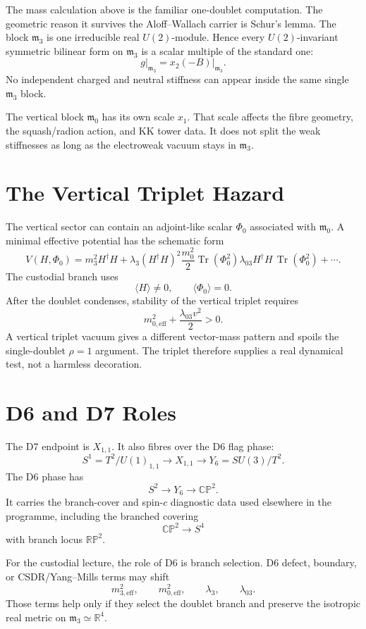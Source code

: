 \documentclass[11pt]{article}
\newcommand{\CP}{\mathbb{CP}}
\newcommand{\RP}{\mathbb{RP}}
\newcommand{\RR}{\mathbb{R}}
\newcommand{\mzero}{\mathfrak m_0}
\newcommand{\mthree}{\mathfrak m_3}
\newcommand{\Tr}{\operatorname{Tr}}
\begin{document}
The mass calculation above is the familiar one-doublet computation.  The
geometric reason it survives the Aloff--Wallach carrier is Schur's lemma.
The block \(\mthree\) is one irreducible real \(U(2)\)-module.  Hence every
\(U(2)\)-invariant symmetric bilinear form on \(\mthree\) is a scalar
multiple of the standard one:
\[
g\big|_{\mthree}=x_2(-B)\big|_{\mthree}.
\]
No independent charged and neutral stiffness can appear inside the same
single \(\mthree\) block.

The vertical block \(\mzero\) has its own scale \(x_1\).  That scale affects
the fibre geometry, the squash/radion action, and KK tower data.  It does
not split the weak stiffnesses as long as the electroweak vacuum stays in
\(\mthree\).

\section{The Vertical Triplet Hazard}

The vertical sector can contain an adjoint-like scalar \(\Phi_0\) associated
with \(\mzero\).  A minimal effective potential has the schematic form
\[
V(H,\Phi_0)=
m_3^2 H^\dagger H+\lambda_3(H^\dagger H)^2
\frac{m_0^2}{2}\Tr(\Phi_0^2)
\lambda_{03}H^\dagger H\,\Tr(\Phi_0^2)+\cdots .
\]
The custodial branch uses
\[
\langle H\rangle\ne0,\qquad \langle\Phi_0\rangle=0 .
\]
After the doublet condenses, stability of the vertical triplet requires
\[
m_{0,\mathrm{eff}}^2+\frac{\lambda_{03}v^2}{2}>0 .
\]
A vertical triplet vacuum gives a different vector-mass pattern and spoils
the single-doublet \(\rho=1\) argument.  The triplet therefore supplies a
real dynamical test, not a harmless decoration.

\section{D6 and D7 Roles}

The D7 endpoint is \(X_{1,1}\).  It also fibres over the D6 flag phase:
\[
S^1=T^2/U(1)_{1,1}\longrightarrow X_{1,1}\longrightarrow
Y_6=SU(3)/T^2 .
\]
The D6 phase has
\[
S^2\longrightarrow Y_6\longrightarrow \CP^2 .
\]
It carries the branch-cover and spin-\(c\) diagnostic data used elsewhere in
the programme, including the branched covering
\[
\CP^2\longrightarrow S^4
\]
with branch locus \(\RP^2\).

For the custodial lecture, the role of D6 is branch selection.  D6 defect,
boundary, or CSDR/Yang--Mills terms may shift
\[
m_{3,\mathrm{eff}}^2,\qquad m_{0,\mathrm{eff}}^2,\qquad \lambda_3,\qquad
\lambda_{03}.
\]
Those terms help only if they select the doublet branch and preserve the
isotropic real metric on \(\mthree\simeq\RR^4\).
\end{document}
